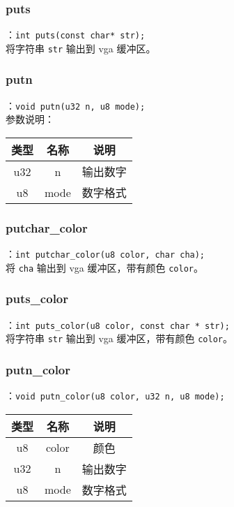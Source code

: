 \subsubsection{puts}
：\texttt{int puts(const char* str);} \\
将字符串 \texttt{str} 输出到 vga 缓冲区。

\subsubsection{putn}
：\texttt{void putn(u32 n, u8 mode);} \\

参数说明：

\begin{tabular}{|c|c|c|}
    \hline
    类型 & 名称 & 说明\\\hline
    u32 & n & 输出数字\\\hline
    u8 & mode & 数字格式\\\hline
\end{tabular}

\subsubsection{putchar\_color}
：\texttt{int putchar\_color(u8 color, char cha);} \\
将 \texttt{cha} 输出到 vga 缓冲区，带有颜色 \texttt{color}。

\subsubsection{puts\_color}
：\texttt{int puts\_color(u8 color, const char * str);} \\
将字符串 \texttt{str} 输出到 vga 缓冲区，带有颜色 \texttt{color}。


\subsubsection{putn\_color}
：\texttt{void putn\_color(u8 color, u32 n, u8 mode);} \\
\begin{tabular}{|c|c|c|}
    \hline
    类型 & 名称 & 说明\\\hline
    u8 & color & 颜色\\\hline
    u32 & n & 输出数字\\\hline
    u8 & mode & 数字格式\\\hline
\end{tabular}\\